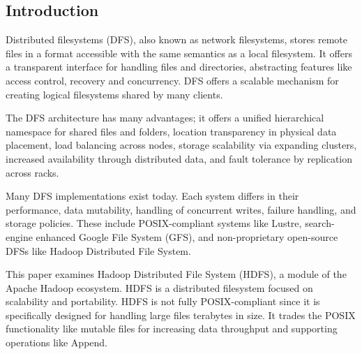 \documentclass[11pt, a4paper]{article}
\begin{document}
\begin{multicols*}{2}


\section{Introduction}

Distributed filesystems (DFS), also known as network filesystems, stores remote files in a format accessible with the same semantics as a local filesystem. It offers a transparent interface for handling files and directories, abstracting features like access control, recovery and concurrency. DFS offers a scalable mechanism for creating logical filesystems shared by many clients.

The DFS architecture has many advantages; it offers a unified hierarchical namespace for shared files and folders, location transparency in physical data placement, load balancing across nodes, storage scalability via expanding clusters, increased availability through distributed data, and fault tolerance by replication across racks.

Many DFS implementations exist today. Each system differs in their performance, data mutability, handling of concurrent writes, failure handling, and storage policies. These include POSIX-compliant systems like Lustre, search-engine enhanced Google File System (GFS), and non-proprietary open-source DFSs like Hadoop Distributed File System.

This paper examines Hadoop Distributed File System (HDFS), a module of the Apache Hadoop ecosystem. HDFS is a distributed filesystem focused on scalability and portability. HDFS is not fully POSIX-compliant since it is specifically designed for handling large files terabytes in size. It trades the POSIX functionality like mutable files for increasing data throughput and supporting operations like Append.


\end{multicols*}
\end{document}
